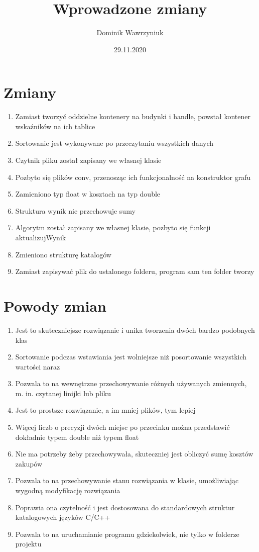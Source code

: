 \documentclass{article}
\title{Wprowadzone zmiany}
\date{29.11.2020}
\author{Dominik Wawrzyniuk}
\begin{document}
\maketitle

\section{Zmiany}

\begin{enumerate}
	\item Zamiast tworzyć oddzielne kontenery na budynki i handle, powstał kontener wskaźników na ich tablice
	\item Sortowanie jest wykonywane po przeczytaniu wszystkich danych
	\item Czytnik pliku został zapisany we własnej klasie
	\item Pozbyto się plików conv, przenosząc ich funkcjonalność na konstruktor grafu
	\item Zamieniono typ float w kosztach na typ double
	\item Struktura wynik nie przechowuje sumy
	\item Algorytm został zapisany we własnej klasie, pozbyto się funkcji aktualizujWynik
	\item Zmieniono strukturę katalogów
	\item Zamiast zapisywać plik do ustalonego folderu, program sam ten folder tworzy
\end{enumerate}

\newpage{}

\section{Powody zmian}

\begin{enumerate}
	\item Jest to skuteczniejsze rozwiązanie i unika tworzenia dwóch bardzo podobnych klas
	\item Sortowanie podczas wstawiania jest wolniejsze niż posortowanie wszystkich wartości naraz
	\item Pozwala to na wewnętrzne przechowywanie różnych używanych zmiennych, m. in. czytanej linijki lub pliku
	\item Jest to prostsze rozwiązanie, a im mniej plików, tym lepiej
	\item Więcej liczb o precyzji dwóch miejsc po przecinku można przedstawić dokładnie typem double niż typem float
	\item Nie ma potrzeby żeby przechowywała, skuteczniej jest obliczyć sumę kosztów zakupów
	\item Pozwala to na przechowywanie stanu rozwiązania w klasie, umożliwiając wygodną modyfikację rozwiązania
	\item Poprawia ona czytelność i jest dostosowana do standardowych struktur katalogowych języków C/C++
	\item Pozwala to na uruchamianie programu gdziekolwiek, nie tylko w folderze projektu
\end{enumerate}
\end{document}
